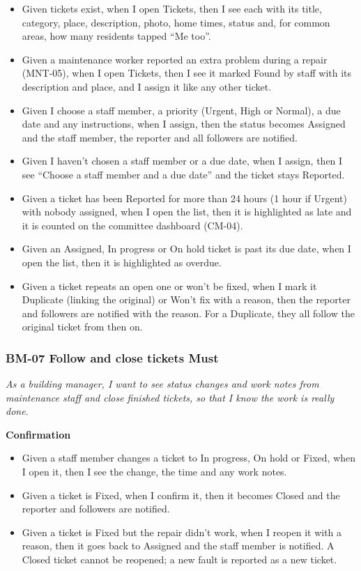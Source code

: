 \documentclass[11pt,a4paper]{report}
\begin{document}
\begin{itemize}
  \item Given tickets exist, when I open Tickets, then I see each with its title, category, place, description, photo, home times, status and, for common areas, how many residents tapped ``Me too''.
  \item Given a maintenance worker reported an extra problem during a repair (MNT-05), when I open Tickets, then I see it marked Found by staff with its description and place, and I assign it like any other ticket.
  \item Given I choose a staff member, a priority (Urgent, High or Normal), a due date and any instructions, when I assign, then the status becomes Assigned and the staff member, the reporter and all followers are notified.
  \item Given I haven't chosen a staff member or a due date, when I assign, then I see ``Choose a staff member and a due date'' and the ticket stays Reported.
  \item Given a ticket has been Reported for more than 24 hours (1 hour if Urgent) with nobody assigned, when I open the list, then it is highlighted as late and it is counted on the committee dashboard (CM-04).
  \item Given an Assigned, In progress or On hold ticket is past its due date, when I open the list, then it is highlighted as overdue.
  \item Given a ticket repeats an open one or won't be fixed, when I mark it Duplicate (linking the original) or Won't fix with a reason, then the reporter and followers are notified with the reason. For a Duplicate, they all follow the original ticket from then on.
\end{itemize}

\subsubsection*{BM-07 \textperiodcentered{} Follow and close tickets \textperiodcentered{} Must}

\emph{As a building manager, I want to see status changes and work notes from maintenance staff and close finished tickets, so that I know the work is really done.}

\medskip\noindent\textbf{Confirmation}\par

\begin{itemize}
  \item Given a staff member changes a ticket to In progress, On hold or Fixed, when I open it, then I see the change, the time and any work notes.
  \item Given a ticket is Fixed, when I confirm it, then it becomes Closed and the reporter and followers are notified.
  \item Given a ticket is Fixed but the repair didn't work, when I reopen it with a reason, then it goes back to Assigned and the staff member is notified. A Closed ticket cannot be reopened; a new fault is reported as a new ticket.
\end{itemize}
\end{document}
